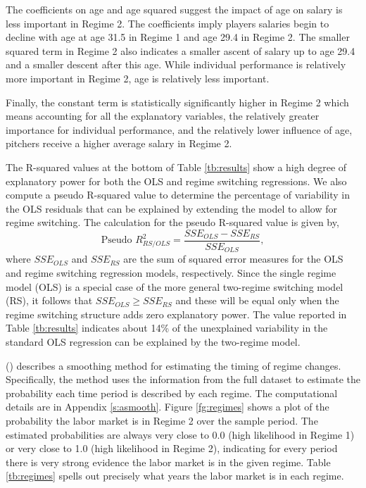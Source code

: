 \documentclass[12pt]{article}
\newcommand{\beq}{\begin{equation}}
\newcommand{\eeq}{\end{equation}}
\newcommand{\citee}[1]{\citename{#1} (\citeyear{#1})}
\begin{document}
The coefficients on age and age squared suggest the impact of age on salary is less important in Regime 2.  The coefficients imply players salaries begin to decline with age at age 31.5 in Regime 1 and age 29.4 in Regime 2.  The smaller squared term in Regime 2 also indicates a smaller ascent of salary up to age 29.4 and a smaller descent after this age.  While individual performance is relatively more important in Regime 2, age is relatively less important.

Finally, the constant term is statistically significantly higher in Regime 2 which means accounting for all the explanatory variables, the relatively greater importance for individual performance, and the relatively lower influence of age, pitchers receive a higher average salary in Regime 2.

The R-squared values at the bottom of Table \ref{tb:results} show a high degree of explanatory power for both the OLS and regime switching regressions.  We also compute a pseudo R-squared value to determine the percentage of variability in the OLS residuals that can be explained by extending the model to allow for regime switching.  The calculation for the pseudo R-squared value is given by,
\beq \mbox{Pseudo } R^2_{RS/OLS} = \frac{SSE_{OLS} - SSE_{RS}}{SSE_{OLS}}, \eeq
where $SSE_{OLS}$ and $SSE_{RS}$ are the sum of squared error measures for the OLS and regime switching regression models, respectively.  Since the single regime model (OLS) is a special case of the more general two-regime switching model (RS), it follows that $SSE_{OLS} \geq SSE_{RS}$ and these will be equal only when the regime switching structure adds zero explanatory power.  The value reported in Table \ref{tb:results} indicates about 14\% of the unexplained variability in the standard OLS regression can be explained by the two-regime model. 

\citee{hamilton1989} describes a smoothing method for estimating the timing of regime changes.  Specifically, the method uses the information from the full dataset to estimate the probability each time period is described by each regime.  The computational details are in Appendix \ref{s:asmooth}.  Figure \ref{fg:regimes} shows a plot of the probability the labor market is in Regime 2 over the sample period.  The estimated probabilities are always very close to 0.0 (high likelihood in Regime 1) or very close to 1.0 (high likelihood in Regime 2), indicating for every period there is very strong evidence the labor market is in the given regime.  Table \ref{tb:regimes} spells out precisely what years the labor market is in each regime.  
\end{document}
